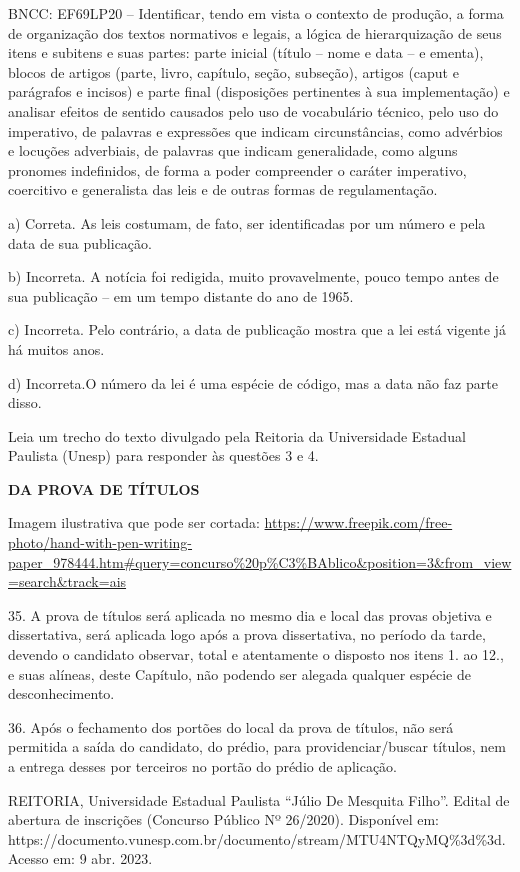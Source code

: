 \begin{itemize}
\begin{itemize}
{\begin{itemize}
\begin{itemize}
\begin{escolha}
\begin{escolha}
\begin{escolha}
\begin{escolha}
\begin{escolha}
BNCC: EF69LP20 -- Identificar, tendo em vista o contexto de produção, a
forma de organização dos textos normativos e legais, a lógica de
hierarquização de seus itens e subitens e suas partes: parte inicial
(título -- nome e data -- e ementa), blocos de artigos (parte, livro,
capítulo, seção, subseção), artigos (caput e parágrafos e incisos) e
parte final (disposições pertinentes à sua implementação) e analisar
efeitos de sentido causados pelo uso de vocabulário técnico, pelo uso do
imperativo, de palavras e expressões que indicam circunstâncias, como
advérbios e locuções adverbiais, de palavras que indicam generalidade,
como alguns pronomes indefinidos, de forma a poder compreender o caráter
imperativo, coercitivo e generalista das leis e de outras formas de
regulamentação.

a) Correta. As leis costumam, de fato, ser identificadas por um número e
pela data de sua publicação.

b) Incorreta. A notícia foi redigida, muito provavelmente, pouco tempo
antes de sua publicação -- em um tempo distante do ano de 1965.

c) Incorreta. Pelo contrário, a data de publicação mostra que a lei está
vigente já há muitos anos.

d) Incorreta.O número da lei é uma espécie de código, mas a data não faz
parte disso.

Leia um trecho do texto divulgado pela Reitoria da Universidade Estadual
Paulista (Unesp) para responder às questões 3 e 4.

\textbf{DA PROVA DE TÍTULOS}

Imagem ilustrativa que pode ser cortada:
\url{https://www.freepik.com/free-photo/hand-with-pen-writing-paper_978444.htm\#query=concurso\%20p\%C3\%BAblico\&position=3\&from_view=search\&track=ais}

35. A prova de títulos será aplicada no mesmo dia e local das provas
objetiva e dissertativa, será aplicada logo após a prova dissertativa,
no período da tarde, devendo o candidato observar, total e atentamente o
disposto nos itens 1. ao 12., e suas alíneas, deste Capítulo, não
podendo ser alegada qualquer espécie de desconhecimento.

36. Após o fechamento dos portões do local da prova de títulos, não será
permitida a saída do candidato, do prédio, para providenciar/buscar
títulos, nem a entrega desses por terceiros no portão do prédio de
aplicação.

REITORIA, Universidade Estadual Paulista ``Júlio De Mesquita Filho''.
Edital de abertura de inscrições (Concurso Público Nº 26/2020).
Disponível em:
https://documento.vunesp.com.br/documento/stream/MTU4NTQyMQ\%3d\%3d.
Acesso em: 9 abr. 2023.


\end{escolha}
\end{escolha}
\end{escolha}
\end{escolha}
\end{escolha}
\end{itemize}
\end{itemize}}
\end{itemize}
\end{itemize}
